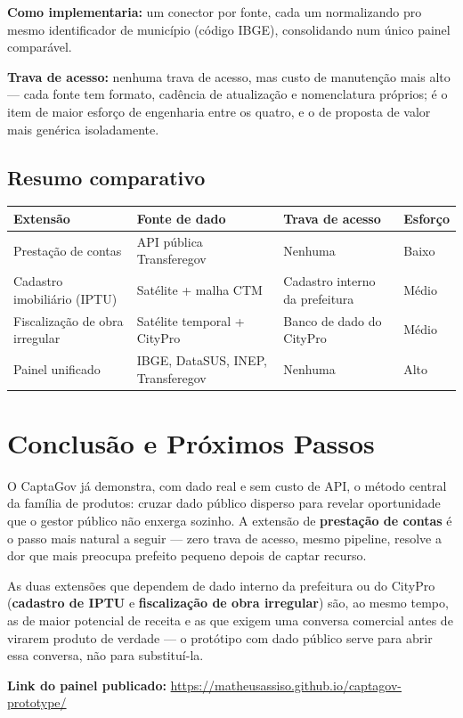 \documentclass[11pt,a4paper]{article}
\begin{document}
\textbf{Como implementaria:} um conector por fonte, cada um normalizando pro mesmo identificador de
município (código IBGE), consolidando num único painel comparável.

\textbf{Trava de acesso:} nenhuma trava de acesso, mas custo de manutenção mais alto --- cada
fonte tem formato, cadência de atualização e nomenclatura próprios; é o item de maior esforço
de engenharia entre os quatro, e o de proposta de valor mais genérica isoladamente.

\subsection{Resumo comparativo}

\begin{center}
\begin{tabular}{@{}p{4.2cm}p{3.6cm}p{3.6cm}p{2.6cm}@{}}
\toprule
\textbf{Extensão} & \textbf{Fonte de dado} & \textbf{Trava de acesso} & \textbf{Esforço} \\
\midrule
Prestação de contas & API pública Transferegov & Nenhuma & Baixo \\
Cadastro imobiliário (IPTU) & Satélite + malha CTM & Cadastro interno da prefeitura & Médio \\
Fiscalização de obra irregular & Satélite temporal + CityPro & Banco de dado do CityPro & Médio \\
Painel unificado & IBGE, DataSUS, INEP, Transferegov & Nenhuma & Alto \\
\bottomrule
\end{tabular}
\end{center}

\section{Conclusão e Próximos Passos}

O CaptaGov já demonstra, com dado real e sem custo de API, o método central da família de
produtos: cruzar dado público disperso para revelar oportunidade que o gestor público não
enxerga sozinho. A extensão de \textbf{prestação de contas} é o passo mais natural a seguir
--- zero trava de acesso, mesmo pipeline, resolve a dor que mais preocupa prefeito pequeno
depois de captar recurso.

As duas extensões que dependem de dado interno da prefeitura ou do CityPro (\textbf{cadastro
de IPTU} e \textbf{fiscalização de obra irregular}) são, ao mesmo tempo, as de maior potencial
de receita e as que exigem uma conversa comercial antes de virarem produto de verdade --- o
protótipo com dado público serve para abrir essa conversa, não para substituí-la.

\vspace{1em}
\noindent\textbf{Link do painel publicado:}
\url{https://matheusassiso.github.io/captagov-prototype/}
\end{document}

